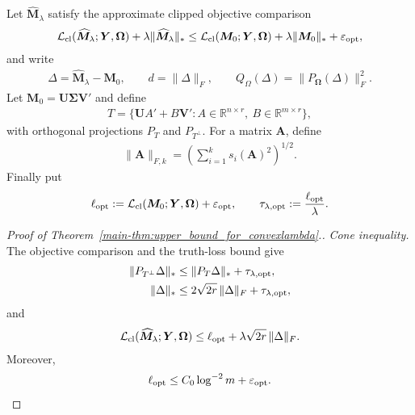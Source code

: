 \documentclass[numsec,webpdf,modern,large,namedate]{oup-authoring-template}
\theoremstyle{plain}
\theoremstyle{remark}
\newcommand{\M}{\bm{M}}
\newcommand{\Y}{\bm{Y}}
\newcommand{\bOmega}{\bm{\Omega}}
\newcommand{\U}{\bm{U}}
\newcommand{\V}{\bm{V}}
\newif\ifmarkchanges
\newenvironment{revision}{\begingroup\ifmarkchanges\color{red}\fi}{\endgroup}
\begin{document}
\begin{revision}
Let $\widehat{\M}_\lambda$ satisfy the approximate clipped objective comparison
\begin{align}
\label{eq:nuclear_approx_objective}
 \mathcal L_{\rm cl}(\widehat{\M}_\lambda;\Y,\bOmega)
 +\lambda\|\widehat{\M}_\lambda\|_*
 \le
 \mathcal L_{\rm cl}(\M_0;\Y,\bOmega)
 +\lambda\|\M_0\|_*
 +\varepsilon_{\rm opt},
\end{align}
and write
\begin{align*}
 \Delta=\widehat{\M}_\lambda-\M_0,
 \qquad
 d=\|\Delta\|_F,
 \qquad
 Q_\Omega(\Delta)=\|P_{\bOmega}(\Delta)\|_F^2.
\end{align*}
Let $\M_0=\U\bm\Sigma\V'$ and define
\begin{align*}
 T
 =
 \{\U A'+B\V':
 A\in\mathbb R^{n\times r},\
 B\in\mathbb R^{m\times r}\},
\end{align*}
with orthogonal projections $P_T$ and
$P_{T^\perp}$.  For a matrix $\bm A$, define
\begin{align*}
 \|\bm A\|_{F,k}
 =
 \left(
 \sum_{i=1}^k s_i(\bm A)^2
 \right)^{1/2}.
\end{align*}
Finally put
\begin{align}
\label{eq:nuclear_ellopt}
 \ell_{\rm opt}
 :=
 \mathcal L_{\rm cl}(\M_0;\Y,\bOmega)
 +\varepsilon_{\rm opt},
 \qquad
 \tau_{\lambda,\rm opt}
 :=
 \frac{\ell_{\rm opt}}{\lambda}.
\end{align}

\begin{proof}[Proof of Theorem~\ref{main-thm:upper_bound_for_convexlambda}.]
\textit{Cone inequality.} The objective comparison and the truth-loss bound give
\begin{align}
 \|P_{T^\perp}\Delta\|_*
 &\le
 \|P_T\Delta\|_*
 +\tau_{\lambda,\rm opt},
 \label{eq:nuclear_cone_slack}\\
 \|\Delta\|_*
 &\le
 2\sqrt{2r}\,\|\Delta\|_F
 +\tau_{\lambda,\rm opt},
 \label{eq:nuclear_effective_rank}
\end{align}
and
\begin{align}
 \mathcal L_{\rm cl}(\widehat{\M}_\lambda;\Y,\bOmega)
 \le
 \ell_{\rm opt}
 +\lambda\sqrt{2r}\,\|\Delta\|_F.
 \label{eq:nuclear_loss_upper}
\end{align}
Moreover,
\begin{align}
\label{eq:nuclear_ellopt_bound}
 \ell_{\rm opt}
 \le
 C_0\log^{-2}m+\varepsilon_{\rm opt}.
\end{align}


\end{proof}
\end{revision}
\end{document}
